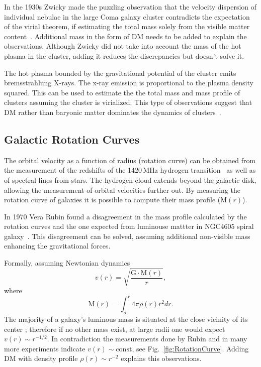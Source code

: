 In the 1930s Zwicky made the puzzling observation that the velocity dispersion of individual nebulae in the large Coma galaxy cluster contradicts the expectation of the virial theorem, if estimating the total mass solely from the visible matter content~\cite{Zwicky:1937zza}. Additional mass in the form of DM needs to be added to explain the observations. Although Zwicky did not take into account the mass of the hot plasma in the cluster, adding it reduces the discrepancies but doesn't solve it. 

The hot plasma bounded by the gravitational potential of the cluster emits bremsstrahlung X-rays. The x-ray emission is proportional to the plasma density squared. This can be used to estimate the the total mass and mass profile of clusters assuming the cluster is virialized. This type of observations suggest that DM rather than baryonic matter dominates the dynamics of clusters~\cite{Lewis:2002mfa}.

 


\subsection{Galactic Rotation Curves}
\label{subsec:RotCurve}
The orbital velocity as a function of radius (rotation curve) can be obtained from the measurement of the redshifts of the 1420\,MHz hydrogen transition~\cite{Begeman:1991iy} as well as of spectral lines from stars. The hydrogen cloud extends beyond the galactic disk, allowing the measurement of orbital velocities further out. By measuring the rotation curve of galaxies it is possible to compute their mass profile ($\textrm{M}(r)$).

In 1970 Vera Rubin found a disagreement in the mass profile calculated by the rotation curves and the one expected from luminouse mattter in NGC4605 spiral galaxy~\cite{Rubin:1980zd}. This disagreement can be solved, assuming additional non-visible mass enhancing the gravitational forces.

Formally, assuming Newtonian dynamics
\begin{equation}
\label{v_r}
v(r) = \sqrt{\frac{\mathrm{G}\cdot \mathrm{M}(r)}{r}},
\end{equation} 
where
\begin{equation}
\label{M_r}
\mathrm{M}(r) =  \int_o^r 4\pi \rho(r)r^2dr.
\end{equation}
The majority of a galaxy's luminous mass is situated at the close vicinity of its center  ; therefore if no other mass exist, at large radii one would expect $v(r) \sim r^{-1/2}$. In contradiction the measurements done by Rubin and in many more experiments indicate $v(r) \sim \mathrm{const}$, see Fig.~\ref{fig:RotationCurve}. Adding DM with density profile $\rho(r) \sim r^{-2}$ explains this observations.

